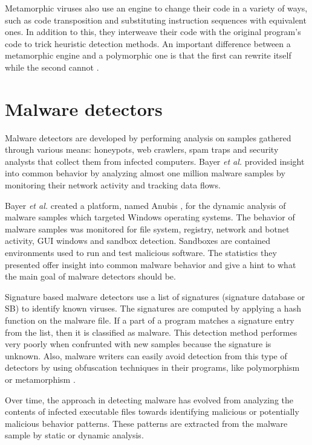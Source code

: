 Metamorphic viruses also use an engine to change their code in a variety of ways, such as code transposition and substituting instruction sequences with equivalent ones. In addition to this, they interweave their code with the original program's code to trick heuristic detection methods. An important difference between a metamorphic engine and a polymorphic one is that the first can rewrite itself while the second cannot \cite{testing-mal-det}.

\section{Malware detectors}
\label{sec:mal-detectors}

Malware detectors are developed by performing analysis on samples gathered through various means: honeypots, web crawlers, spam traps and security analysts that collect them from infected computers. Bayer \textit{et al.} \cite{current-mal-behavior} provided insight into common behavior by analyzing almost one million malware samples by monitoring their network activity and tracking data flows.

Bayer \textit{et al.} created a platform, named Anubis \cite{anubis-platform}, for the dynamic analysis of malware samples which targeted Windows operating systems. The behavior of malware samples was monitored for file system, registry, network and botnet activity, GUI windows and sandbox detection. Sandboxes are contained environments used to run and test malicious software. The statistics they presented offer insight into common malware behavior and give a hint to what the main goal of malware detectors should be.

Signature based malware detectors use a list of signatures (signature database or SB) to identify known viruses. The signatures are computed by applying a hash function on the malware file. If a part of a program matches a signature entry from the list, then it is classified as malware. This detection method performes very poorly when confrunted with new samples because the signature is unknown. Also, malware writers can easily avoid detection from this type of detectors by using obfuscation techniques in their programs, like polymorphism or metamorphism \cite{mining-specifications}. 

Over time, the approach in detecting malware has evolved from analyzing the contents of infected executable files towards identifying malicious or potentially malicious behavior patterns. These patterns are extracted from the malware sample by static or dynamic analysis.

